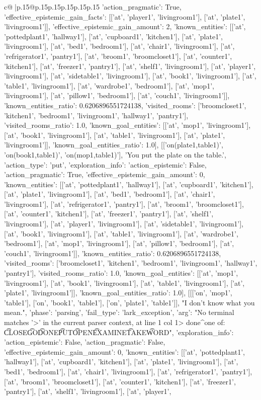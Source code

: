 \documentclass{article}
\begin{document}
{\begin{supertabular}{c@{$\;$}|p{.15\linewidth}@{}p{.15\linewidth}p{.15\linewidth}p{.15\linewidth}p{.15\linewidth}p{.15\linewidth}}
{{{'action_pragmatic': True, 'effective_epistemic_gain_facts': [['at', 'player1', 'livingroom1'], ['at', 'plate1', 'livingroom1']], 'effective_epistemic_gain_amount': 2, 'known_entities': [['at', 'pottedplant1', 'hallway1'], ['at', 'cupboard1', 'kitchen1'], ['at', 'plate1', 'livingroom1'], ['at', 'bed1', 'bedroom1'], ['at', 'chair1', 'livingroom1'], ['at', 'refrigerator1', 'pantry1'], ['at', 'broom1', 'broomcloset1'], ['at', 'counter1', 'kitchen1'], ['at', 'freezer1', 'pantry1'], ['at', 'shelf1', 'livingroom1'], ['at', 'player1', 'livingroom1'], ['at', 'sidetable1', 'livingroom1'], ['at', 'book1', 'livingroom1'], ['at', 'table1', 'livingroom1'], ['at', 'wardrobe1', 'bedroom1'], ['at', 'mop1', 'livingroom1'], ['at', 'pillow1', 'bedroom1'], ['at', 'couch1', 'livingroom1']], 'known_entities_ratio': 0.6206896551724138, 'visited_rooms': ['broomcloset1', 'kitchen1', 'bedroom1', 'livingroom1', 'hallway1', 'pantry1'], 'visited_rooms_ratio': 1.0, 'known_goal_entities': [['at', 'mop1', 'livingroom1'], ['at', 'book1', 'livingroom1'], ['at', 'table1', 'livingroom1'], ['at', 'plate1', 'livingroom1']], 'known_goal_entities_ratio': 1.0}}], [['on(plate1,table1)', 'on(book1,table1)', 'on(mop1,table1)'], 'You put the plate on the table.', {'action_type': 'put', 'exploration_info': {'action_epistemic': False, 'action_pragmatic': True, 'effective_epistemic_gain_amount': 0, 'known_entities': [['at', 'pottedplant1', 'hallway1'], ['at', 'cupboard1', 'kitchen1'], ['at', 'plate1', 'livingroom1'], ['at', 'bed1', 'bedroom1'], ['at', 'chair1', 'livingroom1'], ['at', 'refrigerator1', 'pantry1'], ['at', 'broom1', 'broomcloset1'], ['at', 'counter1', 'kitchen1'], ['at', 'freezer1', 'pantry1'], ['at', 'shelf1', 'livingroom1'], ['at', 'player1', 'livingroom1'], ['at', 'sidetable1', 'livingroom1'], ['at', 'book1', 'livingroom1'], ['at', 'table1', 'livingroom1'], ['at', 'wardrobe1', 'bedroom1'], ['at', 'mop1', 'livingroom1'], ['at', 'pillow1', 'bedroom1'], ['at', 'couch1', 'livingroom1']], 'known_entities_ratio': 0.6206896551724138, 'visited_rooms': ['broomcloset1', 'kitchen1', 'bedroom1', 'livingroom1', 'hallway1', 'pantry1'], 'visited_rooms_ratio': 1.0, 'known_goal_entities': [['at', 'mop1', 'livingroom1'], ['at', 'book1', 'livingroom1'], ['at', 'table1', 'livingroom1'], ['at', 'plate1', 'livingroom1']], 'known_goal_entities_ratio': 1.0}}], [[['on', 'mop1', 'table1'], ['on', 'book1', 'table1'], ['on', 'plate1', 'table1']], "I don't know what you mean.", {'phase': 'parsing', 'fail_type': 'lark_exception', 'arg': "No terminal matches '>' in the current parser context, at line 1 col 1\n\n> done\n^\nExpected one of: \n\t* CLOSE\n\t* GO\n\t* DONE\n\t* PUT\n\t* OPEN\n\t* EXAMINE\n\t* TAKE\n\t* WORD\n", 'exploration_info': {'action_epistemic': False, 'action_pragmatic': False, 'effective_epistemic_gain_amount': 0, 'known_entities': [['at', 'pottedplant1', 'hallway1'], ['at', 'cupboard1', 'kitchen1'], ['at', 'plate1', 'livingroom1'], ['at', 'bed1', 'bedroom1'], ['at', 'chair1', 'livingroom1'], ['at', 'refrigerator1', 'pantry1'], ['at', 'broom1', 'broomcloset1'], ['at', 'counter1', 'kitchen1'], ['at', 'freezer1', 'pantry1'], ['at', 'shelf1', 'livingroom1'], ['at', 'player1', }}}
\end{supertabular}}
\end{document}
